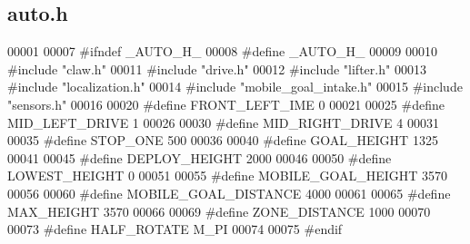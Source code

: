 \subsection{auto.\+h}
\label{auto_8h_source}

\begin{DoxyCode}
00001 
00007 \textcolor{preprocessor}{#ifndef \_AUTO\_H\_}
00008 \textcolor{preprocessor}{#define \_AUTO\_H\_}
00009 
00010 \textcolor{preprocessor}{#include "claw.h"}
00011 \textcolor{preprocessor}{#include "drive.h"}
00012 \textcolor{preprocessor}{#include "lifter.h"}
00013 \textcolor{preprocessor}{#include "localization.h"}
00014 \textcolor{preprocessor}{#include "mobile_goal_intake.h"}
00015 \textcolor{preprocessor}{#include "sensors.h"}
00016 
00020 \textcolor{preprocessor}{#define FRONT\_LEFT\_IME 0}
00021 
00025 \textcolor{preprocessor}{#define MID\_LEFT\_DRIVE 1}
00026 
00030 \textcolor{preprocessor}{#define MID\_RIGHT\_DRIVE 4}
00031 
00035 \textcolor{preprocessor}{#define STOP\_ONE 500}
00036 
00040 \textcolor{preprocessor}{#define GOAL\_HEIGHT 1325}
00041 
00045 \textcolor{preprocessor}{#define DEPLOY\_HEIGHT 2000}
00046 
00050 \textcolor{preprocessor}{#define LOWEST\_HEIGHT 0}
00051 
00055 \textcolor{preprocessor}{#define MOBILE\_GOAL\_HEIGHT 3570}
00056 
00060 \textcolor{preprocessor}{#define MOBILE\_GOAL\_DISTANCE 4000}
00061 
00065 \textcolor{preprocessor}{#define MAX\_HEIGHT 3570}
00066 
00069 \textcolor{preprocessor}{#define ZONE\_DISTANCE 1000}
00070 
00073 \textcolor{preprocessor}{#define HALF\_ROTATE M\_PI}
00074 
00075 \textcolor{preprocessor}{#endif}
\end{DoxyCode}
